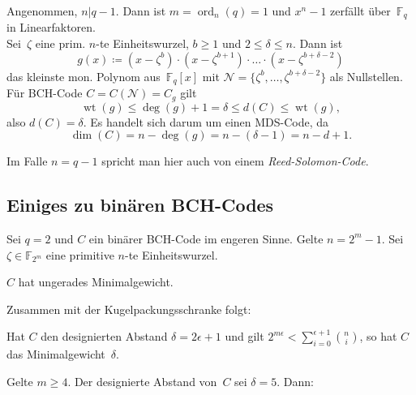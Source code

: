 \documentclass{cheat-sheet}
\newcommand{\F}{\mathbb{F}} %
\DeclareMathOperator{\wt}{wt} %
\newcommand{\divides}{|} %
\DeclareMathOperator{\ord}{ord} %
\begin{document}

\begin{konstr}
  Angenommen, $n \divides q - 1$.
  Dann ist $m = \ord_n(q) = 1$ und $x^n - 1$ zerfällt über~$\F_q$ in Linearfaktoren. \\
  Sei~$\zeta$ eine prim. $n$-te Einheitswurzel, $b \geq 1$ und $2 \leq \delta \leq n$.
  Dann ist
  \[
    g(x) \coloneqq (x - \zeta^b) \cdot (x - \zeta^{b+1}) \cdot \ldots \cdot (x - \zeta^{b + \delta - 2})
  \]
  das kleinste mon. Polynom aus~$\F_q[x]$ mit $\mathcal{N} = \{ \zeta^b, \ldots, \zeta^{b+\delta-2} \}$ als Nullstellen.
  Für BCH-Code $C = C(\mathcal{N}) = C_g$ gilt
  \[
    \wt(g) \leq \deg(g) + 1 = \delta \leq d(C) \leq \wt(g),
  \]
  also $d(C) = \delta$.
  Es handelt sich darum um einen MDS-Code, da
  \[
    \dim(C) = n - \deg(g) = n - (\delta - 1) = n - d + 1.
  \]
\end{konstr}

\begin{defn}
  Im Falle $n = q - 1$ spricht man hier auch von einem \emph{Reed-Solomon-Code}.
\end{defn}

\subsection{Einiges zu binären BCH-Codes}

Sei $q = 2$ und $C$ ein binärer BCH-Code im engeren Sinne.
Gelte $n = 2^m - 1$.
Sei $\zeta \in \F_{2^m}$ eine primitive $n$-te Einheitswurzel.

\begin{satz}
  $C$ hat ungerades Minimalgewicht.
\end{satz}

Zusammen mit der Kugelpackungsschranke folgt:

\begin{prop}
  Hat $C$ den designierten Abstand $\delta = 2 \epsilon + 1$ und gilt $2^{m \epsilon} < {\sum}_{i=0}^{\epsilon + 1} \binom{n}{i}$, so hat $C$ das Minimalgewicht~$\delta$.
\end{prop}

\begin{satz}
  Gelte $m \geq 4$.
  Der designierte Abstand von~$C$ sei $\delta = 5$.
  Dann:
  \begin{itemize}
  \end{itemize}
\end{satz}
\end{document}

